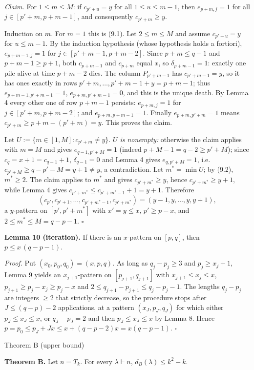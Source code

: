 \documentclass[11pt,a4paper]{article}
\begin{document}
\emph{Claim.} For \(1\le m\le M\): if \(c_{p'+u}=y\) for all
\(1\le u\le m-1\), then \(e_{p+m,j}=1\) for all \(j\in[p'+m,p+m-1]\),
and consequently \(c_{p'+m}\ge y\).

Induction on \(m\). For \(m=1\) this is (9.1). Let \(2\le m\le M\) and
assume \(c_{p'+u}=y\) for \(u\le m-1\). By the induction hypothesis
(whose hypothesis holds a fortiori), \(e_{p+m-1,j}=1\) for
\(j\in[p'+m-1,p+m-2]\). Since \(p+m\le q-1\) and \(p+m-1\ge p+1\), both
\(c_{p+m-1}\) and \(c_{p+m}\) equal \(x\), so \(\delta_{p+m-1}=1\):
exactly one pile alive at time \(p+m-2\) dies. The column \(P_{p'+m-1}\)
has \(c_{p'+m-1}=y\), so it has ones exactly in rows
\(p'+m,\dots,p'+m-1+y=p+m-1\); thus \(e_{p+m-1,p'+m-1}=1\),
\(e_{p+m,p'+m-1}=0\), and this is the unique death. By Lemma 4 every
other one of row \(p+m-1\) persists: \(e_{p+m,j}=1\) for
\(j\in[p'+m,p+m-2]\); and \(e_{p+m,p+m-1}=1\). Finally
\(e_{p+m,p'+m}=1\) means \(c_{p'+m}\ge p+m-(p'+m)=y\). This proves the
claim.

Let \(U:=\{m\in[1,M]:c_{p'+m}\ne y\}\). \emph{\(U\) is nonempty:}
otherwise the claim applies with \(m=M\) and gives \(e_{q-1,p'+M}=1\)
(indeed \(p+M-1=q-2\ge p'+M\)); since \(c_q=x+1=c_{q-1}+1\),
\(\delta_{q-1}=0\) and Lemma 4 gives \(e_{q,p'+M}=1\),
i.e.~\(c_{p'+M}\ge q-p'-M=y+1\ne y\), a contradiction. Let
\(m^*=\min U\); by (9.2), \(m^*\ge2\). The claim applies to \(m^*\) and
gives \(c_{p'+m^*}\ge y\), hence \(c_{p'+m^*}\ge y+1\), while Lemma 4
gives \(c_{p'+m^*}\le c_{p'+m^*-1}+1=y+1\). Therefore
\[(c_{p'},c_{p'+1},\dots,c_{p'+m^*-1},c_{p'+m^*})=(y-1,y,\dots,y,y+1),\]
a \(y\)-pattern on \([p',p'+m^*]\) with \(x'=y\le x\), \(p'\ge p-x\),
and \(2\le m^*\le M=q-p-1\). \(\square\)

\textbf{Lemma 10 (iteration).} If there is an \(x\)-pattern on
\([p,q]\), then \(p\le x\,(q-p-1)\).

\emph{Proof.} Put \((x_0,p_0,q_0)=(x,p,q)\). As long as \(q_j-p_j\ge3\)
and \(p_j\ge x_j+1\), Lemma 9 yields an \(x_{j+1}\)-pattern on
\([p_{j+1},q_{j+1}]\) with \(x_{j+1}\le x_j\le x\),
\(p_{j+1}\ge p_j-x_j\ge p_j-x\) and
\(2\le q_{j+1}-p_{j+1}\le q_j-p_j-1\). The lengths \(q_j-p_j\) are
integers \(\ge2\) that strictly decrease, so the procedure stops after
\(J\le (q-p)-2\) applications, at a pattern \((x_J,p_J,q_J)\) for which
either \(p_J\le x_J\le x\), or \(q_J-p_J=2\) and then
\(p_J\le x_J\le x\) by Lemma 8. Hence
\(p=p_0\le p_J+Jx\le x+(q-p-2)x=x(q-p-1)\). \(\square\)

Theorem B (upper bound)

\textbf{Theorem B.} Let \(n=T_k\). For every \(\lambda\vdash n\),
\(d_B(\lambda)\le k^2-k\).
\end{document}
